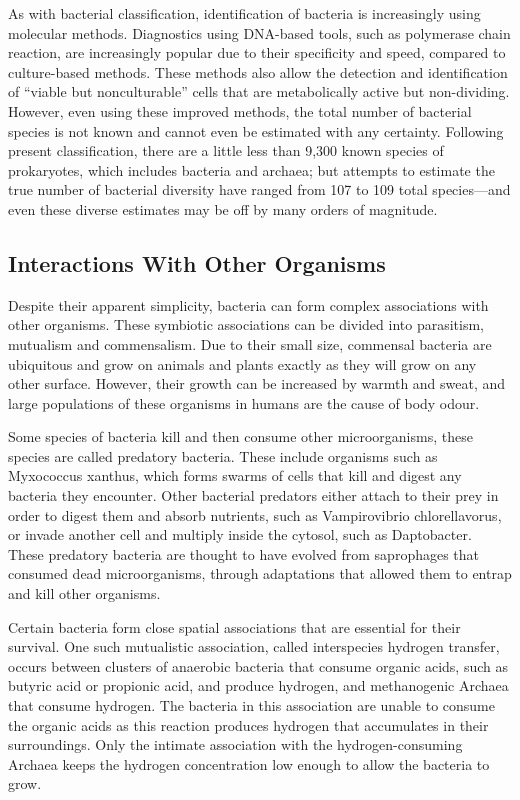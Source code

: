 As with bacterial classification, identification of bacteria is increasingly using molecular methods. Diagnostics using DNA-based tools, such as polymerase chain reaction, are increasingly popular due to their specificity and speed, compared to culture-based methods. These methods also allow the detection and identification of ``viable but nonculturable'' cells that are metabolically active but non-dividing. However, even using these improved methods, the total number of bacterial species is not known and cannot even be estimated with any certainty. Following present classification, there are a little less than 9,300 known species of prokaryotes, which includes bacteria and archaea; but attempts to estimate the true number of bacterial diversity have ranged from 107 to 109 total species---and even these diverse estimates may be off by many orders of magnitude.

\hypertarget{interactions-with-other-organisms}{%
\subsection{Interactions With Other Organisms}\label{interactions-with-other-organisms}}

Despite their apparent simplicity, bacteria can form complex associations with other organisms. These symbiotic associations can be divided into parasitism, mutualism and commensalism. Due to their small size, commensal bacteria are ubiquitous and grow on animals and plants exactly as they will grow on any other surface. However, their growth can be increased by warmth and sweat, and large populations of these organisms in humans are the cause of body odour.

Some species of bacteria kill and then consume other microorganisms, these species are called predatory bacteria. These include organisms such as Myxococcus xanthus, which forms swarms of cells that kill and digest any bacteria they encounter. Other bacterial predators either attach to their prey in order to digest them and absorb nutrients, such as Vampirovibrio chlorellavorus, or invade another cell and multiply inside the cytosol, such as Daptobacter. These predatory bacteria are thought to have evolved from saprophages that consumed dead microorganisms, through adaptations that allowed them to entrap and kill other organisms.

Certain bacteria form close spatial associations that are essential for their survival. One such mutualistic association, called interspecies hydrogen transfer, occurs between clusters of anaerobic bacteria that consume organic acids, such as butyric acid or propionic acid, and produce hydrogen, and methanogenic Archaea that consume hydrogen. The bacteria in this association are unable to consume the organic acids as this reaction produces hydrogen that accumulates in their surroundings. Only the intimate association with the hydrogen-consuming Archaea keeps the hydrogen concentration low enough to allow the bacteria to grow.

